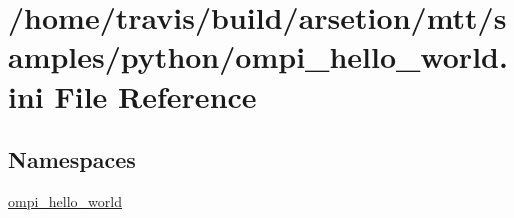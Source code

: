 \hypertarget{ompi__hello__world_8ini}{\section{/home/travis/build/arsetion/mtt/samples/python/ompi\-\_\-hello\-\_\-world.ini File Reference}
\label{ompi__hello__world_8ini}
}
\subsection*{Namespaces}
\begin{DoxyCompactItemize}
\item 
\hyperlink{namespaceompi__hello__world}{ompi\-\_\-hello\-\_\-world}
\end{DoxyCompactItemize}
